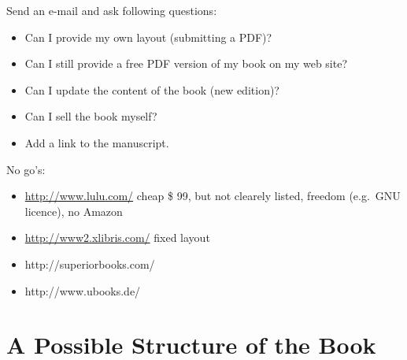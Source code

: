 Send an e-mail and ask following questions:
\begin{itemize}
    \item Can I provide my own layout (submitting a PDF)?
    \item Can I still provide a free PDF version of my book on my
    web site?
    \item Can I update the content of the book (new edition)?
    \item Can I sell the book myself?
    \item Add a link to the manuscript.
\end{itemize}

No go's:
\begin{itemize}
    \item \url{http://www.lulu.com/} cheap \$ 99, but not clearely
    listed, freedom (e.g.\ GNU licence), no Amazon
    \item \url{http://www2.xlibris.com/} fixed layout
    \item http://superiorbooks.com/
    \item http://www.ubooks.de/
\end{itemize}



\section{A Possible Structure of the Book}


